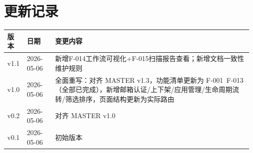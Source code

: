 \documentclass[11pt,a4paper]{article}
\begin{document}
\section*{更新记录}

\begin{tabular}{lll}
\toprule
版本 & 日期 & 变更内容 \\
\midrule
v1.1 & 2026-05-06 & 新增F-014工作流可视化+F-015扫描报告查看；新增文档一致性维护规则 \\
v1.0 & 2026-05-06 & 全面重写：对齐 MASTER v1.3，功能清单更新为 F-001~F-013（全部已完成），新增邮箱认证/上下架/应用管理/生命周期流转/筛选排序，页面结构更新为实际路由 \\
v0.2 & 2026-05-06 & 对齐 MASTER v1.0 \\
v0.1 & 2026-05-06 & 初始版本 \\
\bottomrule
\end{tabular}
\end{document}
